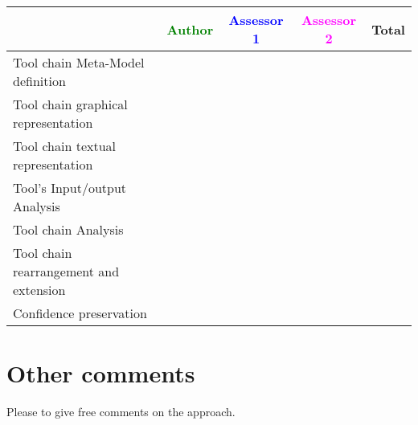 \begin{tabular}{|l | c | c | c | c|} \hline
  & \textcolor{green}{Author} & \textcolor{blue}{Assessor 1} &  \textcolor{magenta}{Assessor 2} & Total \\
  \hline Tool chain Meta-Model definition &
  &                 &                  &\\
  \hline Tool chain graphical representation &
  &                 &                  &\\
  \hline Tool chain textual representation &
  &                 &                  &\\
  \hline Tool's Input/output Analysis &
  &                 &                  &\\
  \hline Tool chain Analysis &
  &                 &                  &\\
  \hline Tool chain rearrangement and extension &
  &                 &                  &\\
  \hline Confidence preservation &
  &                 &                  &\\
  \hline
\end{tabular}


\section{Other comments}
Please to  give free comments on the approach.

